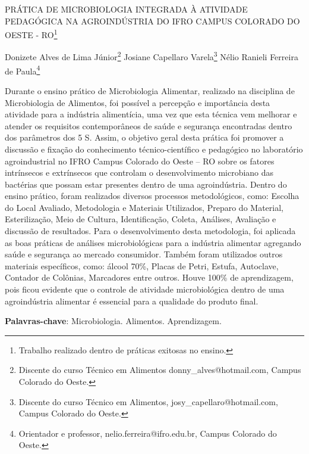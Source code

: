 \documentclass[article,12pt,onesidea,4paper,english,brazil]{abntex2}
\begin{document}
	
	
	\frenchspacing 
	
	\begin{center}
		\LARGE PRÁTICA DE MICROBIOLOGIA INTEGRADA À ATIVIDADE PEDAGÓGICA NA
		AGROINDÚSTRIA DO IFRO CAMPUS COLORADO DO OESTE - RO\footnote{Trabalho realizado dentro de práticas exitosas no ensino.}
		
		\normalsize
	Donizete Alves de Lima Júnior\footnote{Discente do curso Técnico em Alimentos donny\_alves@hotmail.com, Campus Colorado do Oeste.} 
	Josiane Capellaro Varela\footnote{Discente do curso Técnico em Alimentos, josy\_capellaro@hotmail.com, Campus Colorado do Oeste.} 
	Nélio Ranieli Ferreira de Paula\footnote{Orientador e professor, nelio.ferreira@ifro.edu.br, Campus Colorado do Oeste.} 
	\end{center}
	
	\noindent Durante o ensino prático de Microbiologia Alimentar, realizado na disciplina de
	Microbiologia de Alimentos, foi possível a percepção e importância desta atividade
	para a indústria alimentícia, uma vez que esta técnica vem melhorar e atender os
	requisitos contemporâneos de saúde e segurança encontradas dentro dos
	parâmetros dos 5 S. Assim, o objetivo geral desta prática foi promover a discussão e
	fixação do conhecimento técnico-científico e pedagógico no laboratório agroindustrial
	no IFRO Campus Colorado do Oeste – RO sobre os fatores intrínsecos e
	extrínsecos que controlam o desenvolvimento microbiano das bactérias que possam
	estar presentes dentro de uma agroindústria. Dentro do ensino prático, foram
	realizados diversos processos metodológicos, como: Escolha do Local Avaliado,
	Metodologia e Materiais Utilizados, Preparo do Material, Esterilização, Meio de
	Cultura, Identificação, Coleta, Análises, Avaliação e discussão de resultados. Para o
	desenvolvimento desta metodologia, foi aplicada as boas práticas de análises
	microbiológicas para a indústria alimentar agregando saúde e segurança ao
	mercado consumidor. Também foram utilizados outros materiais específicos, como:
	álcool 70\%, Placas de Petri, Estufa, Autoclave, Contador de Colônias, Marcadores
	entre outros. Houve 100\% de aprendizagem, pois ficou evidente que o controle de
	atividade microbiológica dentro de uma agroindústria alimentar é essencial para a
	qualidade do produto final.
	
	\vspace{\onelineskip}
	
	\noindent
	\textbf{Palavras-chave}: Microbiologia. Alimentos. Aprendizagem.
	
\end{document}
